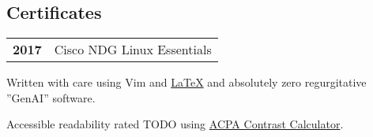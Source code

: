 \documentclass[lighthipster]{simplehipstercv}
\newlength{\rightcolwidth}
\begin{document}
\begin{paracol}{2}
\section*{Certificates}
\begin{tabular}{>{\footnotesize\bfseries}r >{\footnotesize}p{}}
    2017 & Cisco NDG Linux Essentials
\end{tabular}
\bigskip




\vfill{} %
\vspace{4em}
\setlength{\parindent}{0pt}
\begin{minipage}[t]{\rightcolwidth}
\vfill
\begin{center}\fontfamily{\sfdefault}\selectfont \color{black!70}
{
  \small
  Written with care using Vim and \href{https://github.com/izcet/latex-resume}{\LaTeX{}} and absolutely zero regurgitative ''GenAI'' software.
  
  Accessible readability rated TODO using \href{http://www.myndex.com/APCA/}{ACPA Contrast Calculator}.
}
\end{center}
\end{minipage}

\vspace{48em}
\end{paracol}
\end{document}

